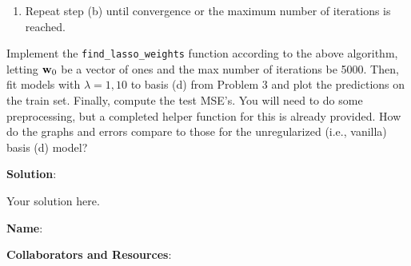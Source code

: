 \documentclass[submit]{../harvardml}
\newenvironment{solution}{
    \vspace{2mm}
    \color{blue}\noindent\textbf{Solution}:
}{}
\begin{document}
\begin{problem}
\begin{enumerate}
\begin{enumerate}
\begin{enumerate}
                \item If $d=1$, set $w_1 = \frac{\rho_1}{||\tilde{\boldx}_1||^2_2}$. Otherwise if $d\ne 1$, compute $w_d = \frac{\text{sign}(\rho_d)\max\left\{|\rho_d|-\frac{\lambda}{2}, 0\right\}}{||\tilde{\boldx}_d||^2_2}$.
            \end{enumerate}
            \item Repeat step (b) until convergence or the maximum number of iterations is reached.
        \end{enumerate} 
    
        Implement the \texttt{find\_lasso\_weights} function according to the above algorithm, letting $\mathbf{w}_0$ be a vector of ones and the max number of iterations be 5000. Then, fit models with $\lambda=1, 10$ to basis (d) from Problem 3 and plot the predictions on the train set. Finally, compute the test MSE's. You will need to do some preprocessing, but a completed helper function for this is already provided. How do the graphs and errors compare to those for the unregularized (i.e., vanilla) basis (d) model? 
    \end{enumerate}
\end{problem}

\newpage

\begin{solution}
	Your solution here.
\end{solution}

\newpage

\textbf{Name}:

\textbf{Collaborators and Resources}: 
\end{document}
